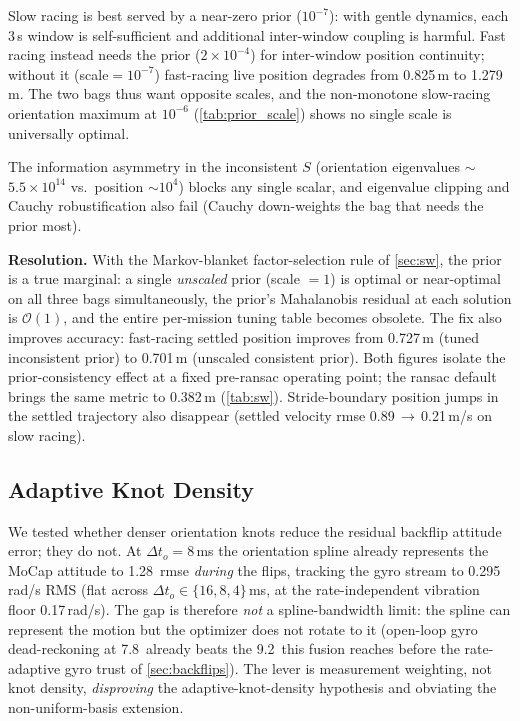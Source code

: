 Slow racing is best served by a near-zero prior ($10^{-7}$): with
gentle dynamics, each 3\,s window is self-sufficient and additional
inter-window coupling is harmful.  Fast racing instead needs the prior
($2{\times}10^{-4}$) for inter-window position continuity;
without it (scale$=10^{-7}$) fast-racing live position degrades from
0.825\,m to 1.279\,m.  The two bags thus want opposite scales, and the
non-monotone slow-racing orientation maximum at $10^{-6}$
(\autoref{tab:prior_scale}) shows no single scale is universally optimal.

The information asymmetry in the inconsistent $S$ (orientation
eigenvalues $\sim$$5.5{\times}10^{14}$ vs.\ position $\sim$$10^4$) blocks any
single scalar, and eigenvalue clipping and Cauchy robustification also fail
(Cauchy down-weights the bag that needs the prior most).

\textbf{Resolution.}
With the Markov-blanket factor-selection rule of \autoref{sec:sw},
the prior is a true marginal: a single \emph{unscaled} prior
(scale $=1$) is optimal or near-optimal on all three bags
simultaneously, the prior's Mahalanobis residual at each solution is
$\mathcal{O}(1)$, and the entire per-mission tuning table becomes
obsolete.  The fix also improves accuracy: fast-racing settled
position improves from 0.727\,m (tuned inconsistent prior) to
0.701\,m (unscaled consistent prior).  Both figures isolate the
prior-consistency effect at a fixed pre-\ac{ransac} operating point; the
\ac{ransac} default brings the same metric to 0.382\,m
(\autoref{tab:sw}).  Stride-boundary position
jumps in the settled trajectory also disappear (settled velocity \ac{rmse}
0.89\,$\to$\,0.21\,m/s on slow racing).

\subsection{Adaptive Knot Density}
\label{sec:negative}
We tested whether denser orientation knots reduce the residual backflip
attitude error; they do not.  At $\Delta t_o{=}8$\,ms the orientation
spline already represents the MoCap attitude to 1.28\degree\ \ac{rmse}
\emph{during} the flips, tracking the gyro stream to 0.295\,rad/s RMS (flat
across $\Delta t_o\in\{16,8,4\}$\,ms, at the rate-independent vibration
floor 0.17\,rad/s).  The gap is therefore \emph{not} a spline-bandwidth
limit: the spline can represent the motion but the optimizer does not
rotate to it (open-loop gyro dead-reckoning at 7.8\degree\ already beats the
9.2\degree\ this fusion reaches before the rate-adaptive gyro trust of
\autoref{sec:backflips}).  The lever is measurement weighting, not knot
density, \emph{disproving} the adaptive-knot-density hypothesis and obviating
the non-uniform-basis extension.
